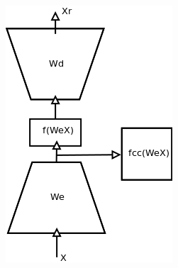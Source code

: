 \documentclass{beamer}
\begin{document}
\begin{frame}
\begin{itemize}
\begin{center}
\includegraphics[scale = 0.20]{SAE.png}
\end{center} 
\end{itemize} 
\end{frame} 
\end{document}
